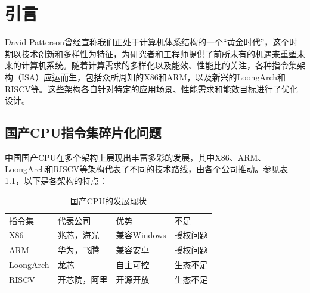 \chapter{引言}\label{chap:introduction}


David Patterson曾经宣称我们正处于计算机体系结构的一个“黄金时代”\cite{goldenage}，这个时期以技术创新和多样性为特征，为研究者和工程师提供了前所未有的机遇来重塑未来的计算机系统。随着计算需求的多样化以及能效、性能比的关注，各种指令集架构（ISA）应运而生，包括众所周知的X86和ARM，以及新兴的LoongArch和RISCV等。这些架构各自针对特定的应用场景、性能需求和能效目标进行了优化设计。

\section{国产CPU指令集碎片化问题}

中国国产CPU在多个架构上展现出丰富多彩的发展，其中X86、ARM、LoongArch和RISCV等架构代表了不同的技术路线，由各个公司推动。参见表\ref{tab:CPUs}，以下是各架构的特点：

\begin{table}[]
\centering
\caption{国产CPU的发展现状}
\label{tab:CPUs}
    \begin{tabular}{llll}
    \rowcolor[HTML]{FBE5D6} 
    指令集       & 代表公司   & 优势        & 不足         \\
    X86       & 兆芯，海光  & 兼容Windows & 授权问题 \\
    ARM       & 华为，飞腾  & 兼容安卓      & 授权问题       \\
    LoongArch & 龙芯     & 自主可控      & 生态不足       \\
    RISCV     & 开芯院，阿里 & 开源开放      & 生态不足      
    \end{tabular}
    \end{table}


